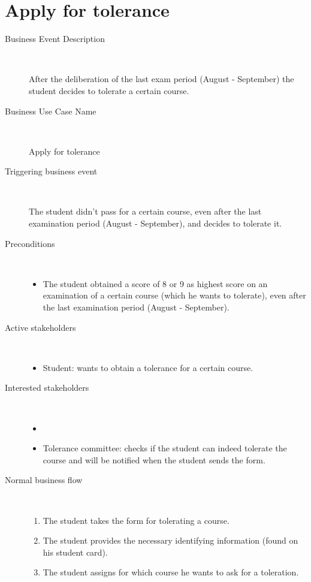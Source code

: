 \section{Apply for tolerance}

\begin{description}
	\item[Business Event Description] \ 
		\par After the deliberation of the last exam period (August - September) the
		student decides to tolerate a certain course. %
	\item[Business Use Case Name] \ 
		\par Apply for tolerance
	\item[Triggering business event] \ 
		\par The student didn't pass for a certain course, even after the last
		examination period (August - September), and decides to tolerate it.
	\item[Preconditions] \
	\begin{itemize}
		\item The student obtained a score of 8 or 9 as highest score on an
		examination of a certain course (which he wants to tolerate), even after the
		last examination period (August - September).
	\end{itemize}
	\item[Active stakeholders] \ 
	\begin{itemize}
		\item Student: wants to obtain a tolerance for a certain course.
	\end{itemize}
	\item[Interested stakeholders] \ 
		\begin{itemize}
		\item \item Tolerance committee: checks if the student can indeed tolerate the
		course and will be notified when the student sends the form.
		\end{itemize}
	\item[Normal business flow] \ 
	\begin{enumerate}
	  	\item The student takes the form for tolerating a course.
	  	\item The student provides the necessary identifying information (found on
	  	his student card).
	  	\item The student assigns for which course he wants to ask for a toleration.

\end{enumerate}
\end{description}
